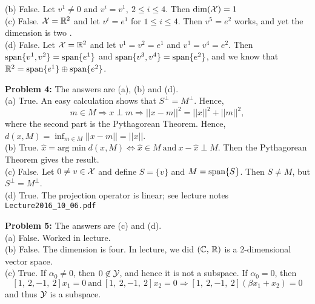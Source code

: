 \documentclass[letterpaper]{article}
\begin{document}
(b) False. Let $v^1\not = 0$ and  $v^i=v^1,~ 2\le i \le 4.$ Then  $\dim({\cal X}) = 1$  \\

(c) False. ${\cal X}=\mathbb R^2$ and let  $v^i=e^1$  for $1\le i \le 4.$  Then $v^5=e^2$ works, and yet the dimension is two .\\

(d) False. Let ${\cal X}=\mathbb R^2$ and let  $v^1=v^2=e^1$  and  $v^3=v^4=e^2$. Then  $ \textrm{span} \{  v^1, v^2 \} = \textrm{span} \{ e^1 \}$ and  $ \textrm{span} \{  v^3, v^4 \} = \textrm{span} \{ e^2 \}$, and we know that $\mathbb R^2= \textrm{span} \{ e^1 \} \oplus \textrm{span} \{  e^2 \}$.\\

\vspace*{4cm}

\bigskip


\noindent \textbf{Problem 4:} The answers are (a), (b) and (d). \\

(a) True. An easy calculation shows that $S^\perp = M^\perp$. Hence,  $$m\in M \Rightarrow x \perp m \Rightarrow ||x-m||^2=||x||^2+||m||^2,$$
where the second part is the Pythagorean Theorem. Hence, $d(x,M)=\inf_{m \in M} ||x-m||=||x||$.\\

(b) True.  $\hat{x} = \text{arg} \min d(x,M) \Leftrightarrow  \hat{x}\in M~\text{and}~ x-\hat{x} \perp M$. Then the Pythagorean Theorem gives the result.  \\

(c) False. Let $0\not =v \in {\cal X}$ and define $S=\{v\}$ and $M=\textrm{span} \{ S \}$. Then $S \not = M$, but $S^\perp=M^\perp$.   \\

(d) True. The projection operator is linear; see lecture notes \verb|Lecture2016_10_06.pdf|




\bigskip



\newpage

\noindent \textbf{Problem 5:} The answers are (c) and (d). \\

(a) False. Worked in lecture. \\

(b) False. The dimension is four. In lecture, we did  $(\mathbb C,\, \mathbb R)$ is a 2-dimensional vector space. \\

(c) True.  If  $\alpha_0\not = 0$, then $0 \not \in {\cal Y}$, and hence it is not a subspace. If $\alpha_0=0$, then
$$[1,~2,-1,~2]x_1 =0~\text{and}~ [1,~2,-1,~2]x_2 =0 \Rightarrow [1,~2,-1,~2](\beta x_1 +x_2)=0$$
and thus ${\cal Y}$ is a subspace.\\
\end{document}
